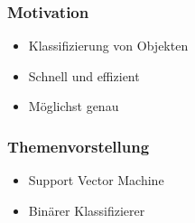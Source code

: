 \begin{frame}
    \frametitle{Motivation}

    \begin{figure}[h]
    \end{figure}

    \vspace{3mm}

    \begin{itemize}
        \item Klassifizierung von Objekten
        \item Schnell und effizient
        \item Möglichst genau
    \end{itemize}
\end{frame}

\begin{frame}
    \frametitle{Themenvorstellung}

    \begin{figure}[h]
    \end{figure}

    \vspace{3mm}

    \begin{itemize}
        \item Support Vector Machine
        \item Binärer Klassifizierer
    \end{itemize}
\end{frame}

